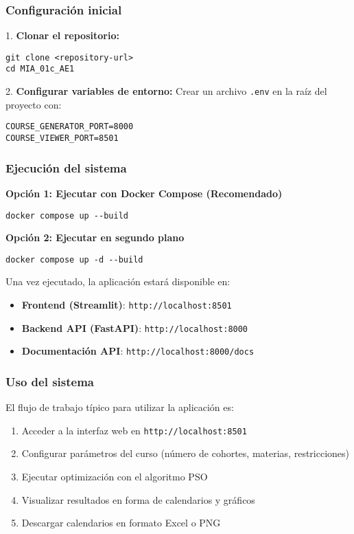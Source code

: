 \subsubsection{Configuración inicial}
1. \textbf{Clonar el repositorio:}
\begin{verbatim}
git clone <repository-url>
cd MIA_01c_AE1
\end{verbatim}

2. \textbf{Configurar variables de entorno:}
Crear un archivo \texttt{.env} en la raíz del proyecto con:
\begin{verbatim}
COURSE_GENERATOR_PORT=8000
COURSE_VIEWER_PORT=8501
\end{verbatim}

\subsubsection{Ejecución del sistema}
\textbf{Opción 1: Ejecutar con Docker Compose (Recomendado)}
\begin{verbatim}
docker compose up --build
\end{verbatim}

\textbf{Opción 2: Ejecutar en segundo plano}
\begin{verbatim}
docker compose up -d --build
\end{verbatim}

Una vez ejecutado, la aplicación estará disponible en:
\begin{itemize}
    \item \textbf{Frontend (Streamlit)}: \texttt{http://localhost:8501}
    \item \textbf{Backend API (FastAPI)}: \texttt{http://localhost:8000}
    \item \textbf{Documentación API}: \texttt{http://localhost:8000/docs}
\end{itemize}

\subsubsection{Uso del sistema}
El flujo de trabajo típico para utilizar la aplicación es:
\begin{enumerate}
    \item Acceder a la interfaz web en \texttt{http://localhost:8501}
    \item Configurar parámetros del curso (número de cohortes, materias, restricciones)
    \item Ejecutar optimización con el algoritmo PSO
    \item Visualizar resultados en forma de calendarios y gráficos
    \item Descargar calendarios en formato Excel o PNG
\end{enumerate}

